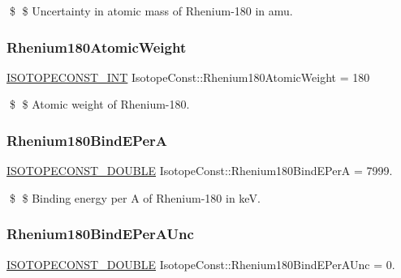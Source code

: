 \$ \$ Uncertainty in atomic mass of Rhenium-\/180 in amu. \mbox{\label{group___isotope_const-_rhenium-_re180_ga8892d7805433a9ed6583c67902c74cbf}} 
\subsubsection{\texorpdfstring{Rhenium180\+Atomic\+Weight}{Rhenium180AtomicWeight}}
{\footnotesize\ttfamily \mbox{\hyperlink{group___isotope_const-_macros_ga5f18360b3e99483a35c32d789e62621c}{I\+S\+O\+T\+O\+P\+E\+C\+O\+N\+S\+T\+\_\+\+I\+NT}} Isotope\+Const\+::\+Rhenium180\+Atomic\+Weight = 180}

\$ \$ Atomic weight of Rhenium-\/180. \mbox{\label{group___isotope_const-_rhenium-_re180_gaa024fd85309890ba925e6b0438b51f33}} 
\subsubsection{\texorpdfstring{Rhenium180\+Bind\+E\+PerA}{Rhenium180BindEPerA}}
{\footnotesize\ttfamily \mbox{\hyperlink{group___isotope_const-_macros_ga8f45a7272ce02c0b4c65c44636ed719a}{I\+S\+O\+T\+O\+P\+E\+C\+O\+N\+S\+T\+\_\+\+D\+O\+U\+B\+LE}} Isotope\+Const\+::\+Rhenium180\+Bind\+E\+PerA = 7999.}

\$ \$ Binding energy per A of Rhenium-\/180 in keV. \mbox{\label{group___isotope_const-_rhenium-_re180_ga083340a435613c746b0cbca65fb9cd2d}} 
\subsubsection{\texorpdfstring{Rhenium180\+Bind\+E\+Per\+A\+Unc}{Rhenium180BindEPerAUnc}}
{\footnotesize\ttfamily \mbox{\hyperlink{group___isotope_const-_macros_ga8f45a7272ce02c0b4c65c44636ed719a}{I\+S\+O\+T\+O\+P\+E\+C\+O\+N\+S\+T\+\_\+\+D\+O\+U\+B\+LE}} Isotope\+Const\+::\+Rhenium180\+Bind\+E\+Per\+A\+Unc = 0.}

